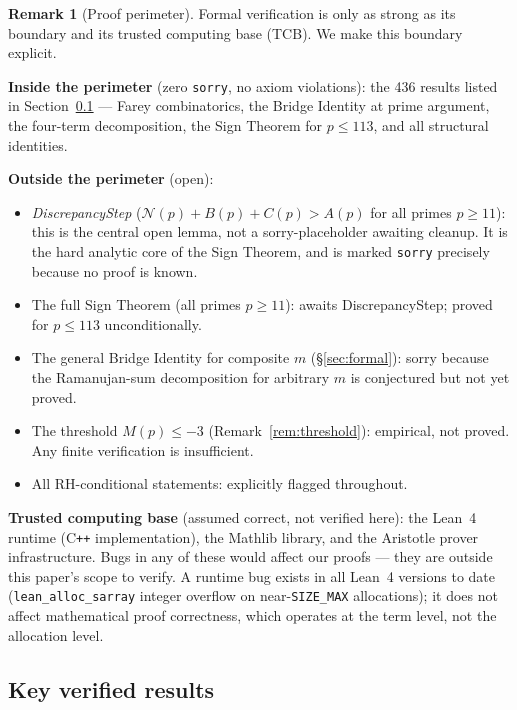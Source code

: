 \documentclass[11pt]{article}
\theoremstyle{definition}
\newtheorem{remark}[theorem]{Remark}
\begin{document}
\begin{remark}[Proof perimeter]\label{rem:proof-perimeter}
Formal verification is only as strong as its boundary and its trusted
computing base (TCB).  We make this boundary explicit.

\textbf{Inside the perimeter} (zero \texttt{sorry}, no axiom violations):
the 436 results listed in Section~\ref{subsec:key-results} — Farey
combinatorics, the Bridge Identity at prime argument, the four-term
decomposition, the Sign Theorem for $p \le 113$, and all structural
identities.

\textbf{Outside the perimeter} (open):
\begin{itemize}
  \item \emph{DiscrepancyStep} ($\mathcal{N}(p) + B(p) + C(p) > A(p)$
    for all primes $p \ge 11$): this is the central open lemma, not a
    sorry-placeholder awaiting cleanup.  It is the hard analytic core
    of the Sign Theorem, and is marked \texttt{sorry} precisely because
    no proof is known.
  \item The full Sign Theorem (all primes $p \ge 11$): awaits
    DiscrepancyStep; proved for $p \le 113$ unconditionally.
  \item The general Bridge Identity for composite $m$
    (\S\ref{sec:formal}): sorry because the Ramanujan-sum
    decomposition for arbitrary $m$ is conjectured but not yet proved.
  \item The threshold $M(p) \le -3$ (Remark~\ref{rem:threshold}):
    empirical, not proved.  Any finite verification is insufficient.
  \item All RH-conditional statements: explicitly flagged throughout.
\end{itemize}

\textbf{Trusted computing base} (assumed correct, not verified here):
the Lean~4 runtime (C\texttt{++} implementation), the Mathlib library,
and the Aristotle prover infrastructure.  Bugs in any of these would
affect our proofs — they are outside this paper's scope to verify.
A runtime bug exists in all Lean~4 versions to date
(\texttt{lean\_alloc\_sarray} integer overflow on near-\texttt{SIZE\_MAX}
allocations); it does not affect mathematical proof correctness, which
operates at the term level, not the allocation level.
\end{remark}

\subsection{Key verified results}\label{subsec:key-results}
\end{document}
